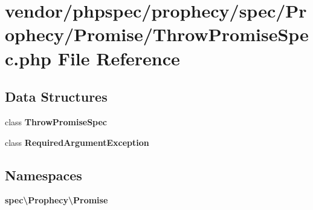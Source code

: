 \section{vendor/phpspec/prophecy/spec/\+Prophecy/\+Promise/\+Throw\+Promise\+Spec.php File Reference}
\label{_throw_promise_spec_8php}
\subsection*{Data Structures}
\begin{DoxyCompactItemize}
\item 
class {\bf Throw\+Promise\+Spec}
\item 
class {\bf Required\+Argument\+Exception}
\end{DoxyCompactItemize}
\subsection*{Namespaces}
\begin{DoxyCompactItemize}
\item 
 {\bf spec\textbackslash{}\+Prophecy\textbackslash{}\+Promise}
\end{DoxyCompactItemize}
